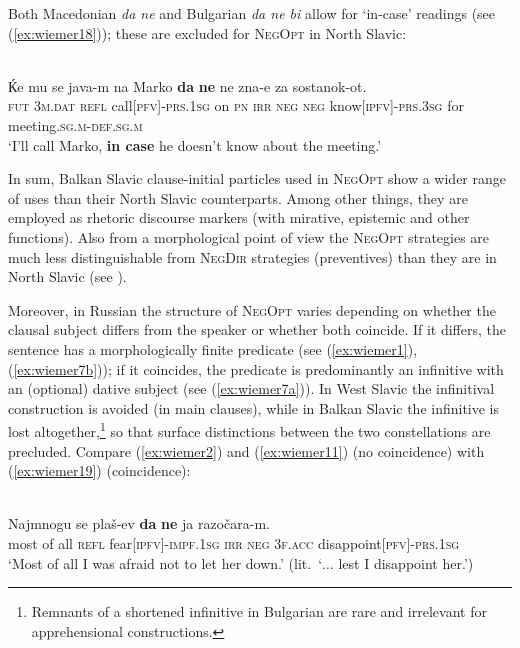 \documentclass[output=paper,colorlinks,citecolor=brown]{langscibook}
\begin{document}
Both Macedonian \textit{da ne} and Bulgarian \textit{da ne bi} allow for `in-case' readings (see (\ref{ex:wiemer18})); these are excluded for \textsc{NegOpt} in North Slavic:


\ea
\label{ex:wiemer18} 
 \\
\gll Ќe mu se java-m na Marko \textbf{da} \textbf{ne} ne zna-e za sostanok-ot. \\
\textsc{fut} \textsc{3m.dat} \textsc{refl} call\textsc{[pfv]-prs.1sg} on \textsc{pn} \textsc{irr} \textsc{neg} \textsc{neg} know\textsc{[ipfv]-prs.3sg} for meeting\textsc{.sg.m-def.sg.m} \\
\glt `I'll call Marko, \textbf{in case} he doesn't know about the meeting.' \\
\z


 In sum, Balkan Slavic clause-initial particles used in \textsc{NegOpt} show a wider range of uses than their North Slavic counterparts. Among other things, they are employed as rhetoric discourse markers (with mirative, epistemic and other functions). Also from a morphological point of view the \textsc{NegOpt} strategies are much less distinguishable from \textsc{NegDir} strategies (preventives) than they are in North Slavic (see ).


Moreover, in Russian the structure of \textsc{NegOpt} varies depending on whether the clausal subject differs from the speaker or whether both coincide. If it differs, the sentence has a morphologically finite predicate (see (\ref{ex:wiemer1}), (\ref{ex:wiemer7b})); if it coincides, the predicate is predominantly an infinitive with an (optional) dative subject (see (\ref{ex:wiemer7a})). In West Slavic the infinitival construction is avoided (in main clauses), while in Balkan Slavic the infinitive is lost altogether,\footnote{Remnants of a shortened infinitive in Bulgarian are rare and irrelevant for apprehensional constructions.} so that surface distinctions between the two constellations are precluded. Compare (\ref{ex:wiemer2}) and (\ref{ex:wiemer11}) (no coincidence) with (\ref{ex:wiemer19}) (coincidence):

\ea
\label{ex:wiemer19} 
 \\
\gll Najmnogu se plaš-ev \textbf{da} \textbf{ne} ja razočara-m. \\
{most of all} \textsc{refl} fear\textsc{[ipfv]-impf.1sg} \textsc{irr} \textsc{neg} \textsc{3f.acc} disappoint\textsc{[pfv]-prs.1sg} \\
\glt `Most of all I was afraid not to let her down.' (lit.\ `$\ldots$ lest I disappoint her.') \\
\z
\end{document}
